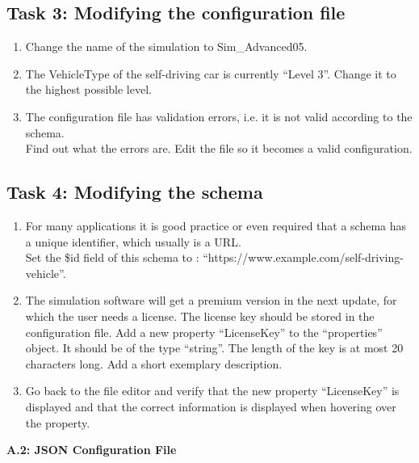 \subsection{Task 3: Modifying the configuration file}
\begin{enumerate}
    \item Change the name of the simulation to Sim\_Advanced05.
    \item The VehicleType of the self-driving car is currently “Level 3”. Change it to the highest possible level.
    \item The configuration file has validation errors, i.e. it is not valid according to the schema.
    \\ Find out what the errors are. Edit the file so it becomes a valid configuration.

\end{enumerate}

\subsection{Task 4: Modifying the schema}
\begin{enumerate}
    \item For many applications it is good practice or even required that a schema has a unique identifier, which usually is a URL. \\Set the \$id field of this schema to : “https://www.example.com/self-driving-vehicle”.
    \item The simulation software will get a premium version in the next update, for which the user needs a license. The license key should be stored in the configuration file. Add a new property “LicenseKey” to the “properties” object. It should be of the type “string”. The length of the key is at most 20 characters long. Add a short exemplary description.
    \item Go back to the file editor and verify that the new property “LicenseKey” is displayed and that the correct information is displayed when hovering over the property.
\end{enumerate}

\newpage
{\large \textbf{A.2: JSON Configuration File  }} \\\\
